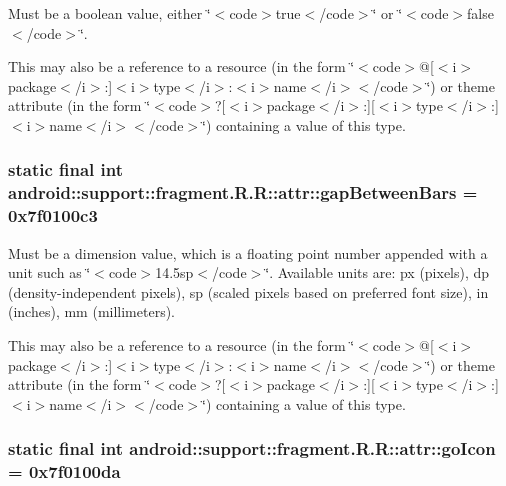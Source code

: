 Must be a boolean value, either \char`\"{}$<$code$>$true$<$/code$>$\char`\"{} or \char`\"{}$<$code$>$false$<$/code$>$\char`\"{}. 

This may also be a reference to a resource (in the form \char`\"{}$<$code$>$@\mbox{[}$<$i$>$package$<$/i$>$:\mbox{]}$<$i$>$type$<$/i$>$:$<$i$>$name$<$/i$>$$<$/code$>$\char`\"{}) or theme attribute (in the form \char`\"{}$<$code$>$?\mbox{[}$<$i$>$package$<$/i$>$:\mbox{]}\mbox{[}$<$i$>$type$<$/i$>$:\mbox{]}$<$i$>$name$<$/i$>$$<$/code$>$\char`\"{}) containing a value of this type. \hypertarget{classandroid_1_1support_1_1fragment_1_1_r_1_1attr_dffbafc2df2923bd6f8abfaf69b497a1}{
\subsubsection[{gapBetweenBars}]{\setlength{\rightskip}{0pt plus 5cm}static final int android::support::fragment.R.R::attr::gapBetweenBars = 0x7f0100c3}}
\label{classandroid_1_1support_1_1fragment_1_1_r_1_1attr_dffbafc2df2923bd6f8abfaf69b497a1}


Must be a dimension value, which is a floating point number appended with a unit such as \char`\"{}$<$code$>$14.5sp$<$/code$>$\char`\"{}. Available units are: px (pixels), dp (density-independent pixels), sp (scaled pixels based on preferred font size), in (inches), mm (millimeters). 

This may also be a reference to a resource (in the form \char`\"{}$<$code$>$@\mbox{[}$<$i$>$package$<$/i$>$:\mbox{]}$<$i$>$type$<$/i$>$:$<$i$>$name$<$/i$>$$<$/code$>$\char`\"{}) or theme attribute (in the form \char`\"{}$<$code$>$?\mbox{[}$<$i$>$package$<$/i$>$:\mbox{]}\mbox{[}$<$i$>$type$<$/i$>$:\mbox{]}$<$i$>$name$<$/i$>$$<$/code$>$\char`\"{}) containing a value of this type. \hypertarget{classandroid_1_1support_1_1fragment_1_1_r_1_1attr_9eb5330de996c836b3a0bcf1ff74e38a}{
\subsubsection[{goIcon}]{\setlength{\rightskip}{0pt plus 5cm}static final int android::support::fragment.R.R::attr::goIcon = 0x7f0100da}}
\label{classandroid_1_1support_1_1fragment_1_1_r_1_1attr_9eb5330de996c836b3a0bcf1ff74e38a}


